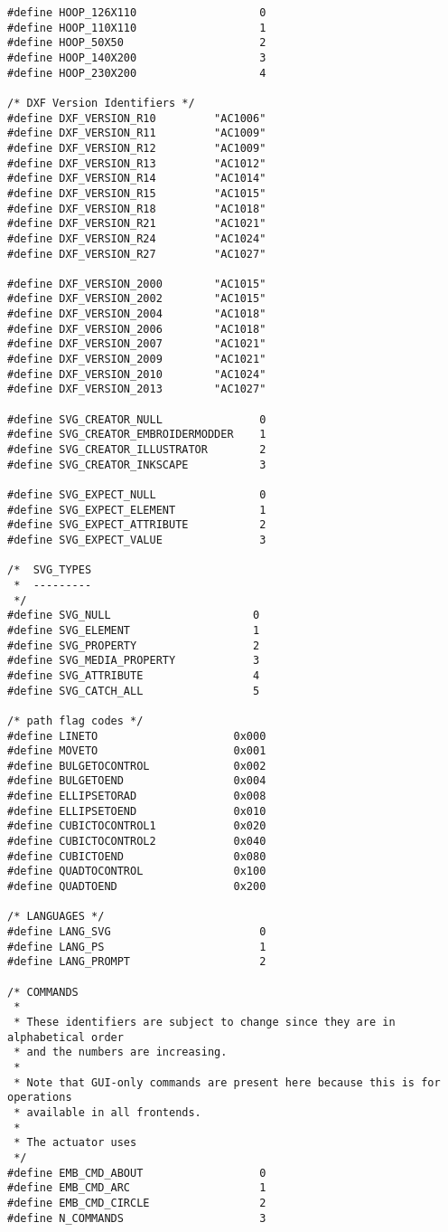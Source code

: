 \begin{verbatim}
#define HOOP_126X110                   0
#define HOOP_110X110                   1
#define HOOP_50X50                     2
#define HOOP_140X200                   3
#define HOOP_230X200                   4

/* DXF Version Identifiers */
#define DXF_VERSION_R10         "AC1006"
#define DXF_VERSION_R11         "AC1009"
#define DXF_VERSION_R12         "AC1009"
#define DXF_VERSION_R13         "AC1012"
#define DXF_VERSION_R14         "AC1014"
#define DXF_VERSION_R15         "AC1015"
#define DXF_VERSION_R18         "AC1018"
#define DXF_VERSION_R21         "AC1021"
#define DXF_VERSION_R24         "AC1024"
#define DXF_VERSION_R27         "AC1027"

#define DXF_VERSION_2000        "AC1015"
#define DXF_VERSION_2002        "AC1015"
#define DXF_VERSION_2004        "AC1018"
#define DXF_VERSION_2006        "AC1018"
#define DXF_VERSION_2007        "AC1021"
#define DXF_VERSION_2009        "AC1021"
#define DXF_VERSION_2010        "AC1024"
#define DXF_VERSION_2013        "AC1027"

#define SVG_CREATOR_NULL               0
#define SVG_CREATOR_EMBROIDERMODDER    1
#define SVG_CREATOR_ILLUSTRATOR        2
#define SVG_CREATOR_INKSCAPE           3

#define SVG_EXPECT_NULL                0
#define SVG_EXPECT_ELEMENT             1
#define SVG_EXPECT_ATTRIBUTE           2
#define SVG_EXPECT_VALUE               3

/*  SVG_TYPES
 *  ---------
 */
#define SVG_NULL                      0
#define SVG_ELEMENT                   1
#define SVG_PROPERTY                  2
#define SVG_MEDIA_PROPERTY            3
#define SVG_ATTRIBUTE                 4
#define SVG_CATCH_ALL                 5

/* path flag codes */
#define LINETO                     0x000
#define MOVETO                     0x001
#define BULGETOCONTROL             0x002
#define BULGETOEND                 0x004
#define ELLIPSETORAD               0x008
#define ELLIPSETOEND               0x010
#define CUBICTOCONTROL1            0x020
#define CUBICTOCONTROL2            0x040
#define CUBICTOEND                 0x080
#define QUADTOCONTROL              0x100
#define QUADTOEND                  0x200

/* LANGUAGES */
#define LANG_SVG                       0
#define LANG_PS                        1
#define LANG_PROMPT                    2

/* COMMANDS
 *
 * These identifiers are subject to change since they are in alphabetical order
 * and the numbers are increasing.
 *
 * Note that GUI-only commands are present here because this is for operations
 * available in all frontends.
 *
 * The actuator uses
 */
#define EMB_CMD_ABOUT                  0
#define EMB_CMD_ARC                    1
#define EMB_CMD_CIRCLE                 2
#define N_COMMANDS                     3


\end{verbatim}
